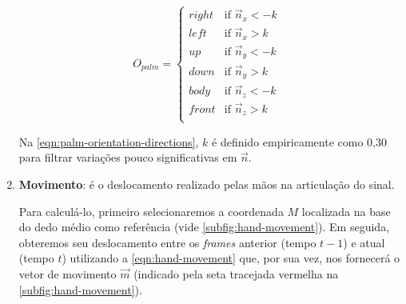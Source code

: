 \begin{enumerate}
          \begin{equation}
              \label{eqn:palm-orientation-directions}
              O_{palm} =
              \begin{cases}
                  right & \text{if $\overrightarrow{n}_x < {-k}$ } \\
                  left  & \text{if $\overrightarrow{n}_x > {k}$ }  \\
                  up    & \text{if $\overrightarrow{n}_y < {-k}$ } \\
                  down  & \text{if $\overrightarrow{n}_y > {k}$ }  \\
                  body  & \text{if $\overrightarrow{n}_z < {-k}$ } \\
                  front & \text{if $\overrightarrow{n}_z > {k}$ }  \\
              \end{cases}
          \end{equation}

          Na \autoref{eqn:palm-orientation-directions}, \(k\) é definido empiricamente como 0,30 para filtrar variações pouco significativas em \(\overrightarrow{n}\).


    \item \textbf{Movimento}: é o deslocamento realizado pelas mãos na articulação do sinal.

          Para calculá-lo, primeiro selecionaremos a coordenada \(M\) localizada na base do dedo médio como referência (vide \autoref{subfig:hand-movement}).
          Em seguida, obteremos seu deslocamento entre os \textit{frames} anterior (tempo \(t-1\)) e atual (tempo \(t\)) utilizando a \autoref{eqn:hand-movement} que, por sua vez, nos fornecerá o vetor de movimento \(\overrightarrow{m}\) (indicado pela seta tracejada vermelha na \autoref{subfig:hand-movement}).


\end{enumerate}
